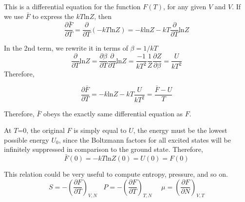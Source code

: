 This is a differential equation for the function $F(T)$, for any given $V$ and $V$. If we use $\bar{F}$ to 
express the $kT\text{ln}Z$, then
\begin{equation}
\frac{\partial{\bar{F}}}{\partial T} = \frac{\partial}{\partial T}(-kT\text{ln}Z) = -k\text{ln}Z - kT \frac{\partial}{\partial T}\text{ln}Z
\end{equation}

In the 2nd term, we rewrite it in terms of $\beta=1/kT$
\begin{equation}
\frac{\partial}{\partial T}\text{ln}Z = \frac{\partial{\beta}}{\partial T} \frac{\partial}{\partial T}\text{ln}Z 
                                      = \frac{-1}{kT^2} \frac{1}{Z} \frac{\partial Z}{\partial {\beta}} 
                                      = \frac{U}{kT^2}
\end{equation}
Therefore,

\begin{equation}
\frac{\partial{\bar{F}}}{\partial T} = -k\text{ln}Z - kT \frac{U}{kT^2} = \frac{\bar{F}-U}{T}
\end{equation}

Therefore, $\bar{F}$ obeys the exactly same differential equation as $F$.

At $T$=0, the original $F$ is simply equal to $U$, the energy must be the lowest possible energy $U_0$, since the Boltzmann
factors for all excited states will be infinitely suppressed in comparison to the ground state. Therefore,
\begin{equation}
\bar{F}(0)= -kT\text{ln}Z(0)= U(0) = F(0)
\end{equation}

This relation could be very useful to compute entropy, pressure, and so on.
\begin{equation}
S = -(\frac{\partial{F}}{\partial{T}})_{V,N} ~~~~  P = -(\frac{\partial{F}}{\partial{T}})_{T,N} 
~~~~~~ \mu = (\frac{\partial{F}}{\partial{N}})_{V,T}
\end{equation}


